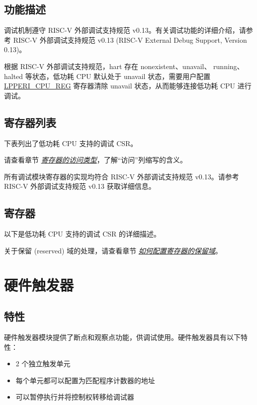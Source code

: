 \documentclass[main\_\_CN.tex]{subfiles}
\begin{document}
\subsection{功能描述}
调试机制遵守 RISC-V 外部调试支持规范 v0.13。有关调试功能的详细介绍，请参考 RISC-V 外部调试支持规范 v0.13 (RISC-V External Debug Support, Version 0.13)。

根据 RISC-V 外部调试支持规范，hart 存在 nonexistent、unavail、 running、halted 等状态，低功耗 CPU 默认处于 unavail 状态，需要用户配置 \hyperref[regdesc:LPPERICPUREG]{LPPERI\_CPU\_REG} 寄存器清除 unavail 状态，从而能够连接低功耗 CPU 进行调试。

\subsection{寄存器列表}

下表列出了低功耗 CPU 支持的调试 CSR。

请查看章节 \hyperref[glossary-access-types]{\textit{寄存器的访问类型}}，了解“访问”列缩写的含义。



所有调试模块寄存器的实现均符合 RISC-V 外部调试支持规范 v0.13。请参考 RISC-V 外部调试支持规范 v0.13 获取详细信息。

\subsection{寄存器}
以下是低功耗 CPU 支持的调试 CSR 的详细描述。

关于保留 (reserved) 域的处理，请查看章节 \hyperref[programming-reserved-field]{\textit{如何配置寄存器的保留域}}。




\section{硬件触发器}\label{sec:ulp-trigger}

\subsection{特性}
硬件触发器模块提供了断点和观察点功能，供调试使用。硬件触发器具有以下特性：

\begin{itemize}
    \item 2 个独立触发单元
    \item 每个单元都可以配置为匹配程序计数器的地址
    \item 可以暂停执行并将控制权转移给调试器

\end{itemize}
\end{document}
